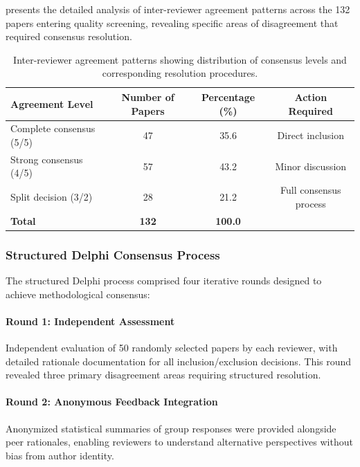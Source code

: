 \documentclass[acmsmall]{acmart}
\begin{document}
 presents the detailed analysis of inter-reviewer agreement patterns across the 132 papers entering quality screening, revealing specific areas of disagreement that required consensus resolution.

\begin{table}[!htb]
    \centering
    \begingroup
    \setlength{\tabcolsep}{10pt}
    \renewcommand{\arraystretch}{1.3}
    \begin{tabular}{lccc}
        \toprule
        \textbf{Agreement Level} & \textbf{Number of Papers} & \textbf{Percentage (\%)} & \textbf{Action Required} \\
        \midrule
        Complete consensus (5/5) & 47 & 35.6 & Direct inclusion \\
        Strong consensus (4/5) & 57 & 43.2 & Minor discussion \\
        Split decision (3/2) & 28 & 21.2 & Full consensus process \\
        \midrule
        \textbf{Total} & \textbf{132} & \textbf{100.0} & \\
        \bottomrule
    \end{tabular}
    \endgroup
    \caption{Inter-reviewer agreement patterns showing distribution of consensus levels and corresponding resolution procedures.}
    \label{tab:consensus_analysis}
\end{table}

\subsubsection{Structured Delphi Consensus Process}\label{subsubsec:inter-reviewer-agreement-delphi-process}

The structured Delphi process comprised four iterative rounds designed to achieve methodological consensus:

\paragraph{Round 1: Independent Assessment}
Independent evaluation of 50 randomly selected papers by each reviewer, with detailed rationale documentation for all inclusion/exclusion decisions. This round revealed three primary disagreement areas requiring structured resolution.

\paragraph{Round 2: Anonymous Feedback Integration}
Anonymized statistical summaries of group responses were provided alongside peer rationales, enabling reviewers to understand alternative perspectives without bias from author identity.
\end{document}

